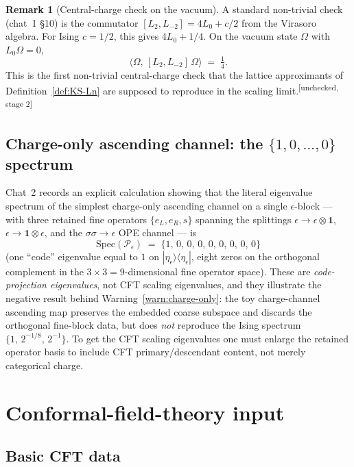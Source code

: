 \documentclass[11pt,a4paper]{article}
\theoremstyle{definition}
\newtheorem{remark}[definition]{Remark}
\newcommand{\one}{\mathbf{1}}
\newcommand{\unchecked}{\textsuperscript{\textcolor{red!70!black}{[unchecked, stage 2]}}}
\begin{document}
\begin{remark}[Central-charge check on the vacuum]
A standard non-trivial check (chat~1 §10) is the commutator
$[L_2, L_{-2}] = 4L_0 + c/2$ from the Virasoro algebra. For Ising $c=1/2$,
this gives $4L_0 + 1/4$. On the vacuum state $\Omega$ with $L_0\Omega = 0$,
\[
\langle\Omega,\,[L_2,L_{-2}]\,\Omega\rangle \;=\; \tfrac{1}{4}.
\]
This is the first non-trivial central-charge check that the lattice
approximants of Definition~\ref{def:KS-Ln} are supposed to reproduce in
the scaling limit.\unchecked
\end{remark}

\subsection{Charge-only ascending channel: the $\{1,0,\dots,0\}$ spectrum}\label{sec:charge-only-channel}

Chat~2 records an explicit calculation showing that the literal eigenvalue
spectrum of the simplest charge-only ascending channel on a single
$\epsilon$-block --- with three retained fine operators $\{e_L, e_R, s\}$
spanning the splittings $\epsilon\to\epsilon\otimes\one$,
$\epsilon\to\one\otimes\epsilon$, and the $\sigma\sigma\to\epsilon$ OPE
channel --- is
\[
\boxed{\;\mathrm{Spec}(\mathcal{P}_\epsilon) \;=\; \{1,\,0,\,0,\,0,\,0,\,0,\,0,\,0,\,0\}\;}
\]
(one ``code'' eigenvalue equal to $1$ on $|\eta_\epsilon\rangle\langle\eta_\epsilon|$,
eight zeros on the orthogonal complement in the
$3\times 3 = 9$-dimensional fine operator space). These are
\emph{code-projection eigenvalues}, not CFT scaling eigenvalues, and they
illustrate the negative result behind Warning~\ref{warn:charge-only}: the
toy charge-channel ascending map preserves the embedded coarse subspace and
discards the orthogonal fine-block data, but does \emph{not} reproduce the
Ising spectrum $\{1,\, 2^{-1/8},\, 2^{-1}\}$. To get the CFT scaling
eigenvalues one must enlarge the retained operator basis to include
CFT primary/descendant content, not merely categorical charge.

\section{Conformal-field-theory input}

\subsection{Basic CFT data}
\end{document}
